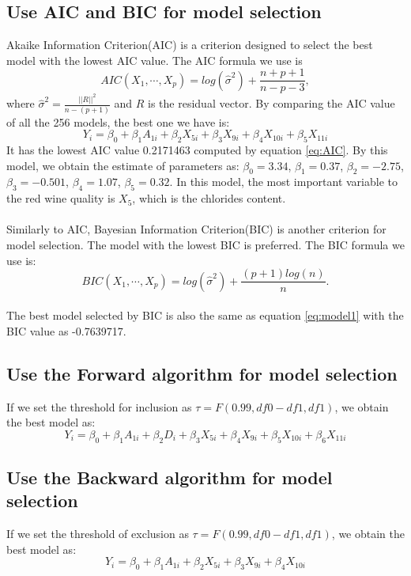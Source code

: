 \documentclass[11pt, oneside]{article}   	%
\begin{document}
\subsection{Use AIC and BIC for model selection}
Akaike Information Criterion(AIC) is a criterion designed to select the best model with the lowest AIC value. The AIC formula we use is 
\begin{equation}\label{eq:AIC}
AIC(X_1,\cdots,X_p)=log(\hat\sigma^2)+\frac{n+p+1}{n-p-3},
\end{equation}
where $\hat\sigma^2=\frac{||R||^2}{n-(p+1)}$ and $R$ is the residual vector.
By comparing the AIC value of all the 256 models, the best one we have is:
\begin{equation}\label{eq:model1}
Y_i=\beta_0+\beta_1A_{1i}+\beta_2X_{5i}+\beta_3X_{9i}+\beta_4X_{10i}+\beta_5X_{11i}
\end{equation}
It has the lowest AIC value 0.2171463 computed by equation \eqref{eq:AIC}.
By this model, we obtain the estimate of parameters as: $\beta_0=3.34$, $\beta_1=0.37$, $\beta_2=-2.75$, $\beta_3=-0.501$, $\beta_4=1.07$, $\beta_5=0.32$. In this model, the most important variable to the red wine quality is $X_5$, which is the chlorides content.\\
\\
Similarly to AIC, Bayesian Information Criterion(BIC) is another criterion for model selection. The model with the lowest BIC is preferred. The BIC formula we use is:
\begin{equation}
BIC(X_1,\cdots,X_p)=log(\hat\sigma^2)+\frac{(p+1)log(n)}{n}.
\end{equation}
\\
The best model selected by BIC is also the same as equation \eqref{eq:model1} with the BIC value as -0.7639717. 
\subsection{Use the Forward algorithm for model selection}
If we set the threshold for inclusion as $\tau=F(0.99,df0-df1,df1)$, we obtain the best model as:
\begin{equation}
Y_i=\beta_0+\beta_1A_{1i}+\beta_2D_i+\beta_3X_{5i}+\beta_4X_{9i}+\beta_5X_{10i}+\beta_6X_{11i}
\end{equation}
\subsection{Use the Backward algorithm for model selection}
If we set the threshold of exclusion as $\tau=F(0.99,df0-df1,df1)$, we obtain the best model as:
\begin{equation}\label{eq:2way}
Y_i=\beta_0+\beta_1A_{1i}+\beta_2X_{5i}+\beta_3X_{9i}+\beta_4X_{10i}
\end{equation}
\end{document}
